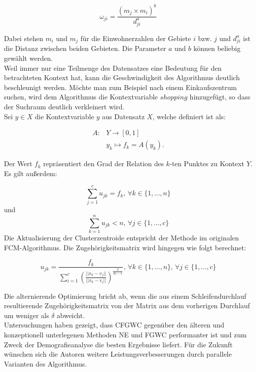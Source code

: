 \documentclass[11pt,ceqn]{book}
\begin{document}
$$\omega_{ji} = \frac{\left(m_j \times m_i\right)^b}{d_{ji}^{a}}$$

Dabei stehen $m_i$ und $m_j$ für die Einwohnerzahlen der Gebiete $i$ bzw. $j$ und $d_{ji}^a$ ist die Distanz zwischen beiden Gebieten. Die Parameter $a$ und $b$ können beliebig gewählt werden. 
\\
Weil immer nur eine Teilmenge des Datensatzes eine Bedeutung für den betrachteten Kontext hat, kann die Geschwindigkeit des Algorithmus deutlich beschleunigt werden. Möchte man zum Beispiel nach einem Einkaufszentrum suchen, wird dem Algorithmus die Kontextvariable $shopping$ hinzugefügt, so dass der Suchraum deutlich verkleinert wird.
\\
Sei $y\in X$ die Kontextvariable $y$ aus Datensatz $X$, welche definiert ist als:

\begin{align*}
A \colon &Y \to \left[0,1\right] \\
  &y_k \mapsto f_k = A(y_k).
\end{align*}

Der Wert $f_k$ repräsentiert den Grad der Relation des $k$-ten Punktes zu Kontext $Y$.
\\
Es gilt außerdem:

$$\sum\limits_{j=1}^c u_{jk} = f_k,\, \forall k\in\{1,\dots,n\}$$
und 
$$\sum\limits_{k=1}^n u_{jk} < n, \, \forall j \in \{1,\dots ,c \}$$
Die Aktualisierung der Clusterzentroide entspricht der Methode im originalen FCM-Algorithmus. Die Zugehörigkeitsmatrix wird hingegen wie folgt berechnet:

$$u_{jk}=\frac{f_k}{\sum\limits_{i=1}^c \left(\frac{||x_k-v_j||}{||x_k-v_i||}\right)^{\frac{2}{m-1}}},\, \forall k\in\{1,\dots,n\},\,\forall j\in\{1,\dots,c\}$$

Die alternierende Optimierung bricht ab, wenn die aus einem Schleifendurchlauf resultierende Zugehörigkeitsmatrix von der Matrix aus dem vorherigen Durchlauf um weniger als $\delta$ abweicht.
\\

Untersuchungen haben gezeigt, dass CFGWC \cite{cfgwc} gegenüber den älteren und konzeptionell unterlegenen Methoden NE \cite{ne} und FGWC \cite{fgwc} performanter ist und zum Zweck der Demografieanalyse die besten Ergebnisse liefert. Für die Zukunft wünschen sich die Autoren weitere Leistungsverbesserungen durch parallele Varianten des Algorithmus.
\end{document}
